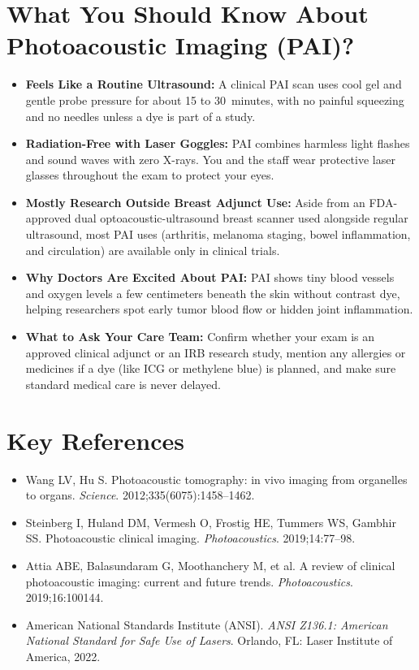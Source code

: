 \section{What You Should Know About Photoacoustic Imaging (PAI)?}
\begin{itemize}
  \item \textbf{Feels Like a Routine Ultrasound:} A clinical PAI scan uses cool gel and gentle probe pressure for about 15 to 30~minutes, with no painful squeezing and no needles unless a dye is part of a study.
  \item \textbf{Radiation-Free with Laser Goggles:} PAI combines harmless light flashes and sound waves with zero X-rays. You and the staff wear protective laser glasses throughout the exam to protect your eyes.
  \item \textbf{Mostly Research Outside Breast Adjunct Use:} Aside from an FDA-approved dual optoacoustic-ultrasound breast scanner used alongside regular ultrasound, most PAI uses (arthritis, melanoma staging, bowel inflammation, and circulation) are available only in clinical trials.
  \item \textbf{Why Doctors Are Excited About PAI:} PAI shows tiny blood vessels and oxygen levels a few centimeters beneath the skin without contrast dye, helping researchers spot early tumor blood flow or hidden joint inflammation.
  \item \textbf{What to Ask Your Care Team:} Confirm whether your exam is an approved clinical adjunct or an IRB research study, mention any allergies or medicines if a dye (like ICG or methylene blue) is planned, and make sure standard medical care is never delayed.
\end{itemize}

\section{Key References}
\begin{itemize}
  \item Wang LV, Hu S. Photoacoustic tomography: in vivo imaging from organelles to organs. \emph{Science}. 2012;335(6075):1458--1462.
  \item Steinberg I, Huland DM, Vermesh O, Frostig HE, Tummers WS, Gambhir SS. Photoacoustic clinical imaging. \emph{Photoacoustics}. 2019;14:77--98.
  \item Attia ABE, Balasundaram G, Moothanchery M, et al. A review of clinical photoacoustic imaging: current and future trends. \emph{Photoacoustics}. 2019;16:100144.
  \item American National Standards Institute (ANSI). \emph{ANSI Z136.1: American National Standard for Safe Use of Lasers}. Orlando, FL: Laser Institute of America, 2022.
\end{itemize}
